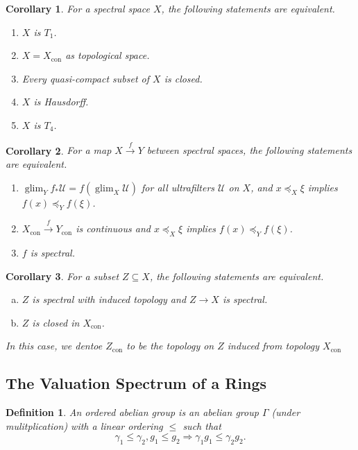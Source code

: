 \documentclass[8pt]{article}
\numberwithin{equation}{section}
\newtheorem{definition}{Definition}[subsection]
\newtheorem{corollary}{Corollary} [subsection]
\DeclareMathOperator{\glim}{glim}
\DeclareMathOperator{\con}{con}
\newcommand{\U}[0]{\mathcal{U}}
\begin{document}
\begin{corollary}
    \label{corollary_6}
    For a spectral space $X$, the following statements are equivalent.
    \begin{enumerate}
        \item $X$ is $T_1$.
        \item $X=X_{\con}$ as topological space.
        \item Every quasi-compact subset of $X$ is closed.
        \item $X$ is Hausdorff.
        \item $X$ is $T_4$.
    \end{enumerate}
\end{corollary}
\begin{corollary}
    \label{corollary_7}
    For a map $X\stackrel{f}{\to}Y$ between spectral spaces, the following statements are equivalent.
    \begin{enumerate}
        \item $\glim_Yf_*\U=f(\glim_X\U)$ for all ultrafilters $\U$ on $X$, and $x\preceq_X \xi$ implies $f(x)\preceq_Y f(\xi)$. 
        \item $X_{\con}\stackrel{f}{\to}Y_{\con}$ is continuous and $x\preceq_X\xi$ implies $f(x)\preceq_Yf(\xi)$.
        \item $f$ is spectral.
    \end{enumerate}
\end{corollary}
\begin{corollary}
    \label{corollary_8}
    For a subset $Z\subseteq X$, the following statements are equivalent.
    \begin{enumerate}[a.]
        \item $Z$ is spectral with induced topology and $Z\to X$ is spectral.
        \item $Z$ is closed in $X_{\con}$.
    \end{enumerate}
    In this case, we dentoe $Z_{\con}$ to be the topology on $Z$ induced from topology $X_{\con}$
\end{corollary}
\subsection{The Valuation Spectrum of a Rings}

\begin{definition}
    \label{definition_1_ordered_abelian_group}
    An ordered abelian group is an abelian group $\Gamma$ (under mulitplication) with a linear ordering $\leq$ such that 
    \begin{equation*}
        \gamma_1\leq \gamma_2, g_1\leq g_2\Rightarrow \gamma_1g_1\leq \gamma_2g_2.
    \end{equation*}
\end{definition}
\end{document}
